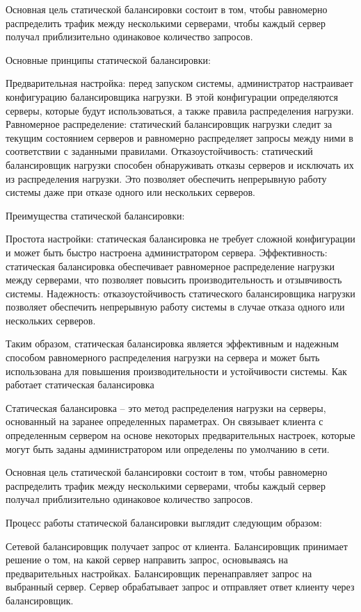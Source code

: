 Основная цель статической балансировки состоит в том, чтобы равномерно распределить трафик между несколькими серверами, чтобы каждый сервер получал приблизительно одинаковое количество запросов.


Основные принципы статической балансировки:

Предварительная настройка: перед запуском системы, администратор настраивает конфигурацию балансировщика нагрузки. В этой конфигурации определяются серверы, которые будут использоваться, а также правила распределения нагрузки.
Равномерное распределение: статический балансировщик нагрузки следит за текущим состоянием серверов и равномерно распределяет запросы между ними в соответствии с заданными правилами.
Отказоустойчивость: статический балансировщик нагрузки способен обнаруживать отказы серверов и исключать их из распределения нагрузки. Это позволяет обеспечить непрерывную работу системы даже при отказе одного или нескольких серверов.

Преимущества статической балансировки:

Простота настройки: статическая балансировка не требует сложной конфигурации и может быть быстро настроена администратором сервера.
Эффективность: статическая балансировка обеспечивает равномерное распределение нагрузки между серверами, что позволяет повысить производительность и отзывчивость системы.
Надежность: отказоустойчивость статического балансировщика нагрузки позволяет обеспечить непрерывную работу системы в случае отказа одного или нескольких серверов.

Таким образом, статическая балансировка является эффективным и надежным способом равномерного распределения нагрузки на сервера и может быть использована для повышения производительности и устойчивости системы.
Как работает статическая балансировка

Статическая балансировка – это метод распределения нагрузки на серверы, основанный на заранее определенных параметрах. Он связывает клиента с определенным сервером на основе некоторых предварительных настроек, которые могут быть заданы администратором или определены по умолчанию в сети.

Основная цель статической балансировки состоит в том, чтобы равномерно распределить трафик между несколькими серверами, чтобы каждый сервер получал приблизительно одинаковое количество запросов.

Процесс работы статической балансировки выглядит следующим образом:

Сетевой балансировщик получает запрос от клиента.
Балансировщик принимает решение о том, на какой сервер направить запрос, основываясь на предварительных настройках.
Балансировщик перенаправляет запрос на выбранный сервер.
Сервер обрабатывает запрос и отправляет ответ клиенту через балансировщик.

